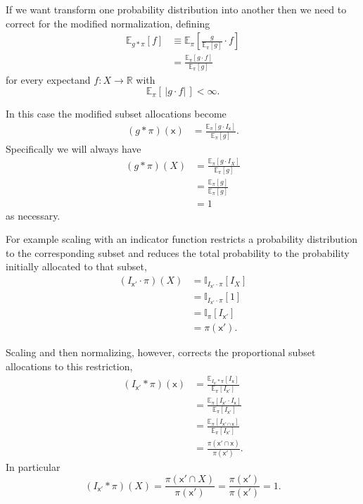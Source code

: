\documentclass[
  letterpaper,
  DIV=11,
  numbers=noendperiod]{scrartcl}
\begin{document}
If we want transform one probability distribution into another then we
need to correct for the modified normalization, defining \begin{align*}
\mathbb{E}_{g \ast \pi} [ f ]
&\equiv
\mathbb{E}_{\pi} \left[ \frac{g}{ \mathbb{E}_{\pi} [ g ] } \cdot f \right]
\\
&=
\frac{ \mathbb{E}_{\pi} [ g \cdot f ] }{ \mathbb{E}_{\pi} [ g ] }
\end{align*} for every expectand \(f: X \rightarrow \mathbb{R}\) with \[
\mathbb{E}_{\pi} [ \, | g \cdot f | \, ] < \infty.
\]

In this case the modified subset allocations become \begin{align*}
(g \ast \pi)(\mathsf{x})
&=
\frac{ \mathbb{E}_{\pi} [ g \cdot I_{\mathsf{x}} ] }
{ \mathbb{E}_{\pi} [ g ] }.
\end{align*} Specifically we will always have \begin{align*}
(g \ast \pi)(X)
&=
\frac{ \mathbb{E}_{\pi} [ g \cdot I_{X} ] }
{ \mathbb{E}_{\pi} [ g ] }
\\
&=
\frac{ \mathbb{E}_{\pi} [ g ] }
{ \mathbb{E}_{\pi} [ g ] }
\\
&=
1
\end{align*} as necessary.

For example scaling with an indicator function restricts a probability
distribution to the corresponding subset and reduces the total
probability to the probability initially allocated to that subset,
\begin{align*}
(I_{\mathsf{x}'} \cdot \pi)(X)
&=
\mathbb{I}_{I_{\mathsf{x}'} \cdot \pi} [ I_{X} ]
\\
&=
\mathbb{I}_{I_{\mathsf{x}'} \cdot \pi} [ 1 ]
\\
&=
\mathbb{I}_{\pi} [ I_{\mathsf{x}'} ]
\\
&=
\pi(\mathsf{x}').
\end{align*}

Scaling and then normalizing, however, corrects the proportional subset
allocations to this restriction, \begin{align*}
(I_{\mathsf{x}'} \ast \pi)( \mathsf{x} )
&=
\frac{ \mathbb{E}_{I_{\mathsf{x}'} \ast \pi} [ I_{\mathsf{x}} ] }
{ \mathbb{E}_{\pi} [ I_{\mathsf{x}'} ] }
\\
&=
\frac{ \mathbb{E}_{\pi} [ I_{\mathsf{x}'} \cdot I_{\mathsf{x}} ] }
{ \mathbb{E}_{\pi} [ I_{\mathsf{x}'} ] }
\\
&=
\frac{ \mathbb{E}_{\pi} [ I_{\mathsf{x}' \cap \mathsf{x}} ] }
{ \mathbb{E}_{\pi} [ I_{\mathsf{x}'} ] }
\\
&=
\frac{ \pi(\mathsf{x}' \cap \mathsf{x}) }
{ \pi(\mathsf{x}') }.
\end{align*} In particular \[
(I_{\mathsf{x}'} \ast \pi)( X )
=
\frac{ \pi(\mathsf{x}' \cap X) }{ \pi(\mathsf{x}') }
=
\frac{ \pi(\mathsf{x}') }{ \pi(\mathsf{x}') }
=
1.
\]
\end{document}
